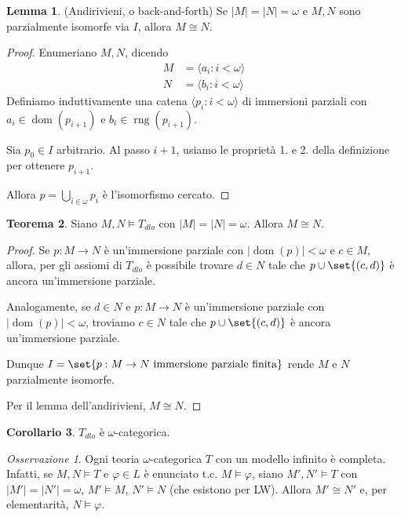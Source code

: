 \documentclass[10pt]{article}
\newcommand{\card}[1]{\left\vert #1 \right\vert}
\newcommand{\1}{\mathds{1}}
\theoremstyle{definition}%
\newtheorem{thm}{Teorema}[section]
\newtheorem{lem}[thm]{Lemma}
\newtheorem{cor}[thm]{Corollario}
\theoremstyle{plain}
\theoremstyle{remark}
\newtheorem*{oss}{Osservazione}
\begin{document}
\begin{lem}
(Andirivieni, o back-and-forth) Se \(\card{M}=\card{N}=\omega\) e \(M,N\) sono parzialmente isomorfe via \(I\), allora \(M\cong N\).
\end{lem}
\begin{proof}
Enumeriano \(M,N\), dicendo
\begin{align*}
M&=\langle a_{i}: i <\omega\rangle\\
N&=\langle b_{i}: i <\omega\rangle
\end{align*}
Definiamo induttivamente una catena \(\langle p_{i}:i<\omega\rangle\) di immersioni parziali con \(a_{i} \in \operatorname{dom}(p_{i+1})\) e \(b_{i} \in \operatorname{rng}(p_{i+1})\).

Sia \(p_{0} \in I\) arbitrario. Al passo \(i+1\), usiamo le proprietà 1. e 2. della definizione per ottenere \(p_{i+1}\).

Allora \(p=\bigcup_{i \in \omega}p_{i}\) è l'isomorfismo cercato.
\end{proof}

\begin{thm}
Siano \(M,N\vDash T_{dlo}\) con \(\card{M}=\card{N}=\omega\). Allora \(M\cong N\).
\end{thm}

\begin{proof}
Se \(p:M\to N\) è un'immersione parziale con \(\card{\operatorname{dom}(p)}<\omega\) e \(c \in M\), allora, per gli assiomi di \(T_{dlo}\) è possibile trovare \(d \in N\) tale che \(p\cup\set{(c,d)}\) è ancora un'immersione parziale.

Analogamente, se \(d \in N\) e \(p:M\to N\) è un'immersione parziale con \(\card{\operatorname{dom}(p)}<\omega\), troviamo \(c \in N\) tale che \(p\cup\set{(c,d)}\) è ancora un'immersione parziale.

Dunque \(I=\set{p:M\to N\text{ immersione parziale finita}}\) rende \(M\) e \(N\) parzialmente isomorfe.

Per il lemma dell'andirivieni, \(M\cong N\).
\end{proof}

\begin{cor}
\(T_{dlo}\) è \(\omega\)-categorica.
\end{cor}

\begin{oss}
Ogni teoria \(\omega\)-categorica \(T\) con un modello infinito è completa. Infatti, se \(M,N\vDash T\) e \(\varphi \in L\) è enunciato t.c. \(M\vDash\varphi\), siano \(M',N'\vDash T\) con \(\card{M'}=\card{N'}=\omega\), \(M'\vDash M\), \(N'\vDash N\) (che esistono per LW). Allora \(M'\cong N'\) e, per elementarità, \(N\vDash\varphi\).
\end{oss}
\end{document}
